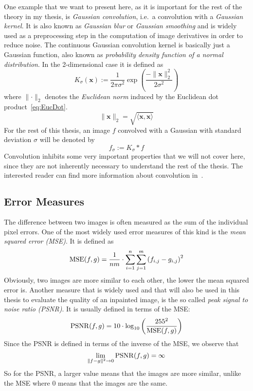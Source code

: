 One example that we want to present here, as it is important for the rest of the theory in my
thesis, is \textit{Gaussian convolution}, i.e.\ a convolution with a
\textit{Gaussian kernel}. It is also known as \textit{Gaussian blur} or \textit{Gaussian
smoothing} and is widely used as a preprocessing step in the computation of image derivatives in
order to reduce noise.
The continuous Gaussian convolution kernel is basically just a Gaussian function, also known as
\textit{probability density function of a normal distribution}. In the 2-dimensional case it is defined as
\begin{equation}
    K_\sigma (\boldsymbol x) := \frac{1}{2\pi\sigma^2}\exp\left(\frac{-\lVert\boldsymbol
            x\rVert_2^2}{2\sigma^2}\right)
\end{equation}
where $\lVert \cdot \rVert_2$ denotes the \textit{Euclidean norm} induced by the Euclidean dot
product~\eqref{eq:EucDot}.
\begin{equation}
    \lVert \mathbf{x} \lVert_2 = \sqrt{\langle \mathbf{x}, \mathbf{x} \rangle}
\end{equation}
For the rest of this thesis, an image $f$ convolved with a Gaussian with standard deviation $\sigma$
will be denoted by \[f_\sigma := K_\sigma * f\]
Convolution inhibits some very important properties that we will not cover here, since they are not
inherently necessary to understand the rest of the thesis. The interested reader can find more
information about convolution in~\cite{dspguide, ipcv}.

\subsection{Error Measures}\label{sec:ErrorMeasure}

The difference between two images is often measured as the sum of the individual pixel errors. 
One of the most widely used error measures of this kind is the \textit{mean squared error (MSE)}. It is
defined as 
\begin{equation}
    \operatorname{MSE}(f, g) = \frac{1}{nm}\cdot\sum_{i=1}^{n}\sum_{j=1}^{m} {(f_{i,j} - g_{i,j})}^2
\end{equation}
Obviously, two images are more similar to each other, the lower the mean squared error is.
Another measure that is widely used and that will also be used in this thesis to evaluate the
quality of an inpainted image, is the so called \textit{peak signal to noise ratio (PSNR)}. 
It is usually defined in terms of the MSE\@:
\begin{equation}
    \operatorname{PSNR}(f, g) = 10 \cdot \log_{10}\left({\frac{255^2}{\operatorname{MSE}(f, g)}}\right)
\end{equation}
Since the PSNR is defined in terms of the inverse of the MSE, we observe that
\begin{equation}
    \lim_{\lVert f-g \rVert^2\to 0}\operatorname{PSNR}(f, g) = \infty
\end{equation}
So for the PSNR, a larger value means that the images are more similar, unlike the MSE where 0 
means that the images are the same. 

